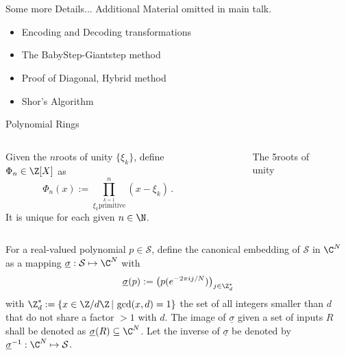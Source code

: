 \appendix
\section{\appendixname}
\begin{frame}{Some more Details...}
  Additional Material omitted in main talk.

  \begin{itemize}
    \item Encoding and Decoding transformations
    \item The BabyStep-Giantstep method
    \item Proof of Diagonal, Hybrid method
    \item Shor's Algorithm
  \end{itemize}
\end{frame}

\begin{frame}{Polynomial Rings}
  \begin{columns}
    \begin{column}{0.6\linewidth}
      \begin{definition}
        Given the $n$\th roots of unity $\{\xi_k\}$, define $\Phi_n \in \Z[X]$ as
        $$\Phi_n(x) := \prod_{\stackrel{k=1}{\xi_k \mathrm{primitive}}}^{n} (x - \xi_k) \,.$$
        It is unique for each given $n \in \N$.
      \end{definition}
    \end{column}
    \begin{column}{0.32\linewidth}
      \begin{figure}
        \caption{The 5\th roots of unity}
        \label{fig:nth-roots-of-unity}
      \end{figure}
    \end{column}
  \end{columns}
\end{frame}

\begin{frame}[c]
  \begin{definition}
    For a real-valued polynomial $p \in \mathcal{S}$, define the canonical embedding of $\mathcal{S}$ in $\C^N$ as a mapping $\underline{\sigma}: \mathcal{S} \mapsto \C^N$ with $$\underline{\sigma}(p) := \big(p(e^{-2\pi i j / N})\big)_{j \in \Z_d^*}$$ with $\Z_d^* := \{x \in \Z / d\Z \,|\, \gcd(x, d) = 1\}$ the set of all integers smaller than $d$ that do not share a factor $> 1$ with $d$.
    The image of $\underline{\sigma}$ given a set of inputs $R$ shall be denoted as $\underline{\sigma}(R) \subseteq \C^N$.
    Let the inverse of $\underline{\sigma}$ be denoted by $\underline{\sigma}\inv: \C^N \mapsto \mathcal{S}$.
  \end{definition}
\end{frame}


